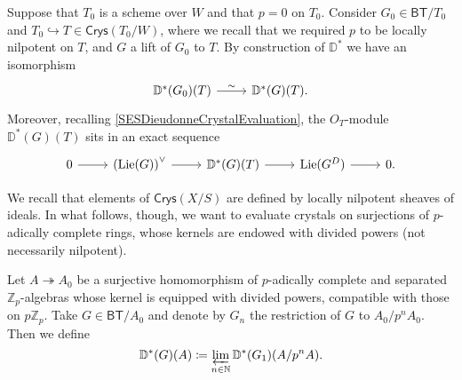 \begin{rem}[]\label{rem:DGValuationRestriction}
	Suppose that $T_0$ is a scheme over $W$ and that $p = 0$ on $T_0$.
	Consider $G_0 \in \mathsf{BT}/T_0$ and $T_0 \hookrightarrow T \in \mathsf{Crys}(T_0/W)$,
	where we recall that we required $p$ to be locally nilpotent on \(T\),
	and $G$ a lift of $G_0$ to $T$.
	By construction of $\mathbb{D}^*$ we have an isomorphism
	\begin{equation*}
	\begin{tikzcd}[row sep = 0ex
		,/tikz/column 1/.append style={anchor=base east}
		,/tikz/column 2/.append style={anchor=base west}]
		\mathbb{D}^*(G_0)(T) \arrow[r, "\sim", rightarrow] &
		\mathbb{D}^*(G)(T)
	.\end{tikzcd}
	\end{equation*} 
	Moreover, recalling \cref{SESDieudonneCrystalEvaluation},
	the $O_{ T }$-module $\mathbb{D}^*(G)(T)$ sits in an exact sequence
	\begin{equation*}
	\begin{tikzcd}
		0 \arrow[r, "", rightarrow] &
		\left( \lie(G) \right)^\vee \arrow[r, "", rightarrow] &
		\mathbb{D}^*(G)(T) \arrow[r, "", rightarrow] &
		\lie(G^D) \arrow[r, "", rightarrow] &
		0
	.\end{tikzcd}
	\end{equation*}
\end{rem}


\noindent
We recall that elements of $\mathsf{Crys}(X/S)$ are defined by
locally nilpotent sheaves of ideals.
In what follows, though, we want to evaluate crystals on
surjections of $p$-adically complete rings, whose kernels are endowed with divided powers
(not necessarily nilpotent).
\begin{defn}[]\label{defn:NotNilpotentEvaluation}
	Let $A \twoheadrightarrow A_0$ be a surjective homomorphism
	of $p$-adically complete and separated $\mathbb{Z}_{p}$-algebras
	whose kernel is equipped with divided powers, compatible with those on $p \mathbb{Z}_{p}$.
	Take $G \in \mathsf{BT}/A_0$ and
	denote by $G_n$ the restriction of $G$ to $A_0/p^nA_0$.
	Then we define
	\begin{equation*}
		\mathbb{D}^*(G)(A) \coloneqq
		\varprojlim_{n \in \mathbb{N}} \mathbb{D}^*(G_1)(A/p^nA)
	.\end{equation*}
\end{defn}


